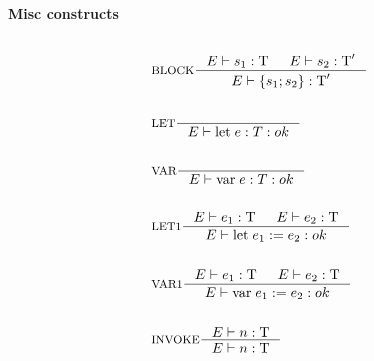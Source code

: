 \paragraph{Misc constructs}
\begin{align*}
\intertext{}
&\inference[BLOCK]{\Tenv s_1: \Tt & \Tenv s_2: \Tt'}
                 {\Tenv \{s_1; s_2\} : \Tt'}
\\\\
&\inference[LET]{}
                 {\Tenv \mathbin{\text{let}} \; e:T: ok}
\\\\
&\inference[VAR]{}
                 {\Tenv \mathbin{\text{var}} \; e:T: ok}
\\\\
&\inference[LET1]{\Tenv e_1: \Tt & \Tenv e_2: \Tt}
                 {\Tenv \mathbin{\text{let}} \; e_1 := e_2: ok}
\\\\
&\inference[VAR1]{\Tenv e_1: \Tt & \Tenv e_2: \Tt}
                 {\Tenv \mathbin{\text{var}} \; e_1 := e_2: ok}
\\\\
&\inference[INVOKE]{\Tenv n: \Tt}
                 {\Tenv n: \Tt}
\end{align*}
